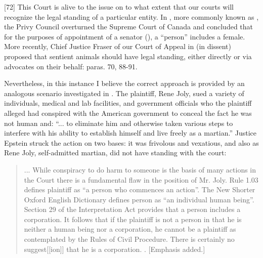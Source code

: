 [72]      This Court is alive to the issue on to what extent that our courts will recognize the legal standing of a particular entity. In 
, more commonly known as 
, the Privy Council overturned the Supreme Court of Canada and concluded that for the purposes of appointment of a senator 
(), a ``person'' includes a female. More recently, Chief Justice Fraser of our Court of Appeal in 
 (in dissent) proposed that sentient animals should have legal standing, either directly or via advocates on their behalf: paras. 70, 88-91.
 

\par\bigskip
[73]      Nevertheless, in this instance I believe the correct approach is provided by an analogous scenario investigated in 
. The plaintiff, Rene Joly, sued a variety of individuals, medical and lab facilities, and government officials who the plaintiff alleged had conspired with the American government to conceal the fact he was not human and: ``... to eliminate him and otherwise taken various steps to interfere with his ability to establish himself and live freely as a martian.'' Justice Epstein struck the action on two bases: it was frivolous and vexatious, and also as Rene Joly, self-admitted martian, did not have standing with the court:

 
\begin{quotation}
... While conspiracy to do harm to someone is the basis of many actions in the Court there is a fundamental flaw in the position of Mr. Joly. Rule 1.03 defines plaintiff as ``a person who commences an action''. The New Shorter Oxford English Dictionary defines person as ``an individual human being''. Section 29 of the Interpretation Act provides that a person includes a corporation. It follows that if the plaintiff is not a person in that he is neither a human being nor a corporation, he cannot be a plaintiff as contemplated by the Rules of Civil Procedure.  There is certainly no suggest[[ion]] that he is a corporation. . [Emphasis added.]
\end{quotation}

